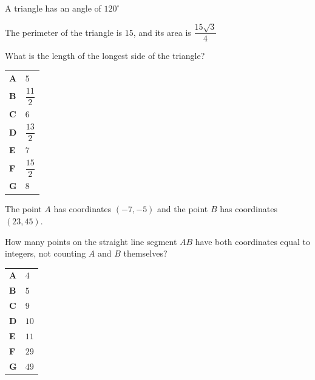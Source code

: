 \documentclass[11pt,a4paper]{article}
\begin{document}
\clearpage
\thispagestyle{djspaper}
\vspace*{8pt}
\begin{enumerate}[label=\textbf{\arabic*.},leftmargin=*,itemsep=0pt,start=17]
\questionitem[Trigonometry]
A triangle has an angle of $120^\circ$ 

The perimeter of the triangle is $15$, and its area is $\dfrac{15\sqrt{3}}{4}$ \vspace*{5pt}

What is the length of the longest side of the triangle?

\par\vspace*{12pt}
\begin{tabularx}{\linewidth}{@{}>{\bfseries}l Y@{}}
A &
$5$
\\[0.8em]
B &
$\dfrac{11}{2}$
\\[0.8em]
C &
$6$
\\[0.8em]
D &
$\dfrac{13}{2}$
\\[0.8em]
E &
$7$
\\[0.8em]
F &
$\dfrac{15}{2}$
\\[0.8em]
G &
$8$
\\
\end{tabularx}
\end{enumerate}
\clearpage
\thispagestyle{djspaper}
\vspace*{8pt}
\begin{enumerate}[label=\textbf{\arabic*.},leftmargin=*,itemsep=0pt,start=18]
The point $A$ has coordinates $(-7,-5)$ and the point $B$ has coordinates $(23,45)$.

How many points on the straight line segment $AB$ have both coordinates equal to integers, not counting $A$ and $B$ themselves?

\par\vspace*{12pt}
\begin{tabularx}{\linewidth}{@{}>{\bfseries}l Y@{}}
A &
$4$
\\[0.8em]
B &
$5$
\\[0.8em]
C &
$9$
\\[0.8em]
D &
$10$
\\[0.8em]
E &
$11$
\\[0.8em]
F &
$29$
\\[0.8em]
G &
$49$
\\
\end{tabularx}
\end{enumerate}
\end{document}
